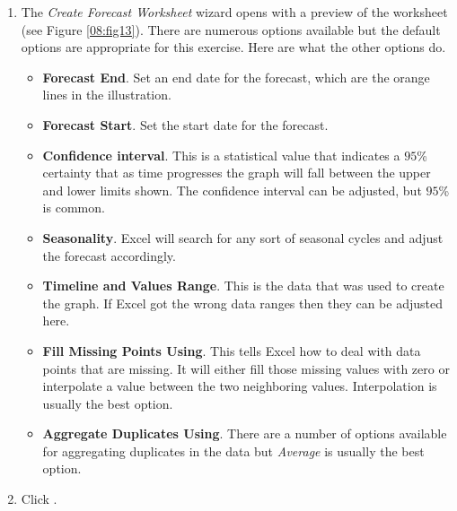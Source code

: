 \begin{enumerate}[resume]
	
	\item The \textit{Create Forecast Worksheet} wizard opens with a preview of the worksheet (see Figure \ref{08:fig13}). There are numerous options available but the default options are appropriate for this exercise. Here are what the other options do.
	
	\begin{itemize}
		\item \textbf{Forecast End}. Set an end date for the forecast, which are the orange lines in the illustration.
		\item \textbf{Forecast Start}. Set the start date for the forecast.
		\item \textbf{Confidence interval}. This is a statistical value that indicates a $ 95 $\% certainty that as time progresses the graph will fall between the upper and lower limits shown. The confidence interval can be adjusted, but $ 95 $\% is common.
		\item \textbf{Seasonality}. Excel will search for any sort of seasonal cycles and adjust the forecast accordingly.
		\item \textbf{Timeline and Values Range}. This is the data that was used to create the graph. If Excel got the wrong data ranges then they can be adjusted here.
		\item \textbf{Fill Missing Points Using}. This tells Excel how to deal with data points that are missing. It will either fill those missing values with zero or interpolate a value between the two neighboring values. Interpolation is usually the best option.
		\item \textbf{Aggregate Duplicates Using}. There are a number of options available for aggregating duplicates in the data but \textit{Average} is usually the best option.
	\end{itemize}	
	
	\item Click .

\end{enumerate}


